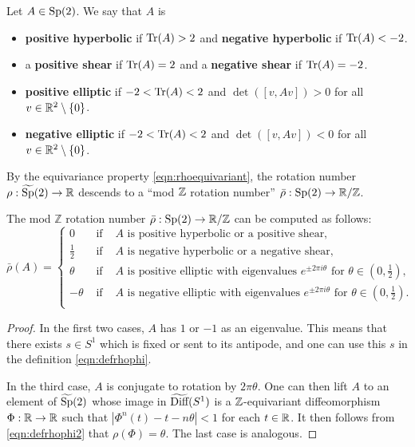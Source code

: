 \begin{definition}
\label{def:classifySp2}
Let $A \in \text{Sp}(2)$. We say that $A$ is
\begin{itemize}
	\item {\bf positive hyperbolic} if $\operatorname{Tr}(A) > 2$ and {\bf negative hyperbolic} if $\operatorname{Tr}(A) < -2$.
	\item a {\bf positive shear} if $\operatorname{Tr}(A) = 2$ and a {\bf negative shear} if $\operatorname{Tr}(A) = -2$.
	\item {\bf positive elliptic} if $-2 < \operatorname{Tr}(A) < 2$ and $\det([v,Av]) > 0$ for all $v \in {\mathbb R}^2\setminus\{0\}$.
	\item {\bf negative elliptic} if $-2 < \operatorname{Tr}(A) < 2$ and $\det([v,Av]) < 0$ for all $v \in {\mathbb R}^2\setminus\{0\}$.
\end{itemize}
\end{definition}

By the equivariance property \eqref{eqn:rhoequivariant}, the rotation number $\rho:\widetilde{\text{Sp}}(2)\to{\mathbb R}$ descends to a ``mod ${\mathbb Z}$ rotation number'' $\bar{\rho}:\text{Sp}(2)\to{\mathbb R}/{\mathbb Z}$.

\begin{lemma}
\label{lem:compute_rho_bar}
The mod $\mathbb{Z}$ rotation number $\bar{\rho}:\text{Sp}(2) \to {\mathbb R}/{\mathbb Z}$ can be computed as follows:
\[
\bar{\rho}(A) = \left\{
\begin{array}{ccc}
0 & \text{ if } & A \text{ is positive hyperbolic or a positive shear,}\\
\frac{1}{2} & \text{ if } & A \text{ is negative hyperbolic or a negative shear,}\\
\theta & \text{ if } & A \text{ is positive elliptic with eigenvalues }e^{\pm 2 \pi i \theta} \text{ for } \theta \in (0,\frac{1}{2}),\\
-\theta & \text{ if } & A \text{ is negative elliptic with eigenvalues }e^{\pm 2 \pi i \theta} \text{ for } \theta \in (0,\frac{1}{2}).\\
\end{array}
\right.
\]
\end{lemma}

\begin{proof}
In the first two cases, $A$ has $1$ or $-1$ as an eigenvalue. This means that there exists $s\in S^1$ which is fixed or sent to its antipode, and one can use this $s$ in the definition \eqref{eqn:defrhophi}.

In the third case, $A$ is conjugate to rotation by $2\pi\theta$. One can then lift $A$ to an element of $\widetilde{\text{Sp}}(2)$ whose image in $\widetilde{\text{Diff}}(S^1)$ is a ${\mathbb Z}$-equivariant diffeomorphism $\Phi:{\mathbb R}\to{\mathbb R}$ such that $|\Phi^n(t)-t-n\theta|<1$ for each $t\in{\mathbb R}$. It then follows from \eqref{eqn:defrhophi2} that $\rho(\Phi)=\theta$. The last case is analogous.
\end{proof}

